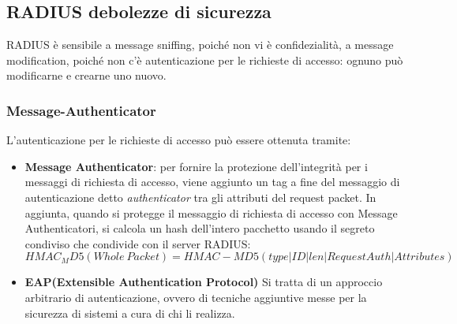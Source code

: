 \documentclass{article}
\theoremstyle{remark}
\begin{document}
\subsection{RADIUS debolezze di sicurezza}
RADIUS è sensibile a message sniffing, poiché non vi è confidezialità, a message modification, poiché non c'è autenticazione per le richieste di accesso: ognuno può modificarne e crearne uno nuovo.
\subsubsection{Message-Authenticator}
L'autenticazione per le richieste di accesso può essere ottenuta tramite:\begin{itemize}
	\item \textbf{Message Authenticator}: per fornire la protezione dell'integrità per i messaggi di richiesta di accesso, viene aggiunto un tag a fine del messaggio di autenticazione detto \emph{authenticator} tra gli attributi del request packet. In aggiunta, quando si protegge il messaggio di richiesta di accesso con Message Authenticatori, si calcola un hash dell'intero pacchetto usando il segreto condiviso che condivide con il server RADIUS:$HMAC_MD5(Whole\ Packet)=HMAC-MD5(type|ID|len|RequestAuth|Attributes)$
	\item \textbf{EAP(Extensible Authentication Protocol)} Si tratta di un approccio arbitrario di autenticazione, ovvero di tecniche aggiuntive messe per la sicurezza di sistemi a cura di chi li realizza.
\end{itemize}
\end{document}
